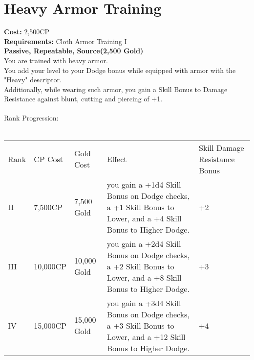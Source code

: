 \section{Heavy Armor Training}\label{perk:heavyArmorTraining}
\textbf{Cost:} 2,500CP\\
\textbf{Requirements:} Cloth Armor Training I\\
\textbf{Passive, Repeatable, Source(2,500 Gold)}\\
You are trained with heavy armor.\\
You add your level to your Dodge bonus while equipped with armor with the "Heavy" descriptor.\\
Additionally, while wearing such armor, you gain a Skill Bonus to Damage Resistance against blunt, cutting and piercing of +1.\\
\\

Rank Progression:\\
\\
\begin{longtable}{l | l | l | l | p{9cm}}
    Rank & CP Cost & Gold Cost & Effect & Skill Damage Resistance Bonus \\
    II
    & 7,500CP
    & 7,500 Gold
    & you gain a +1d4 Skill Bonus on Dodge checks, a +1 Skill Bonus to Lower, and a +4 Skill Bonus to Higher Dodge.
    & +2
    \\
    III
    & 10,000CP
    & 10,000 Gold
    & you gain a +2d4 Skill Bonus on Dodge checks, a +2 Skill Bonus to Lower, and a +8 Skill Bonus to Higher Dodge.
    & +3
    \\
    IV
    & 15,000CP
    & 15,000 Gold
    & you gain a +3d4 Skill Bonus on Dodge checks, a +3 Skill Bonus to Lower, and a +12 Skill Bonus to Higher Dodge.
    & +4
    \\
\end{longtable}